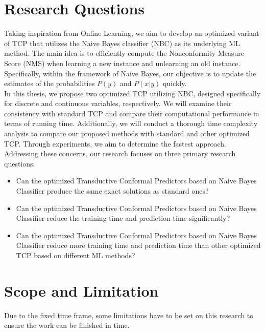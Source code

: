 \documentclass[10pt]{reportMaster}
\begin{document}
\section{Research Questions}

Taking inspiration from Online Learning, we aim to develop an optimized variant of TCP that utilizes the Naive Bayes classifier (NBC) as its underlying ML method. The main idea is to efficiently compute the Nonconformity Measure Score (NMS) when learning a new instance and unlearning an old instance. Specifically, within the framework of Naive Bayes, our objective is to update the estimates of the probabilities $P(y)$ and $P(x|y)$ quickly.\\

\noindent In this thesis, we propose two optimized TCP utilizing NBC, designed specifically for discrete and continuous variables, respectively. We will examine their consistency with standard TCP and compare their computational performance in terms of running time. Additionally, we will conduct a thorough time complexity analysis to compare our proposed methods with standard and other optimized TCP. Through experiments, we aim to determine the fastest approach. Addressing these concerns, our research focuses on three primary research questions:

\begin{itemize}
\item Can the optimized Transductive Conformal Predictors based on Naive Bayes Classifier produce the same exact solutions as standard ones?
\item Can the optimized Transductive Conformal Predictors based on Naive Bayes Classifier reduce the training time and prediction time significantly?
\item Can the optimized Transductive Conformal Predictors based on Naive Bayes Classifier reduce more training time and prediction time than other optimized TCP based on different ML methods?
\end{itemize}

\section{Scope and Limitation}
Due to the fixed time frame, some limitations have to be set on this research to ensure the
work can be finished in time.
\end{document}
